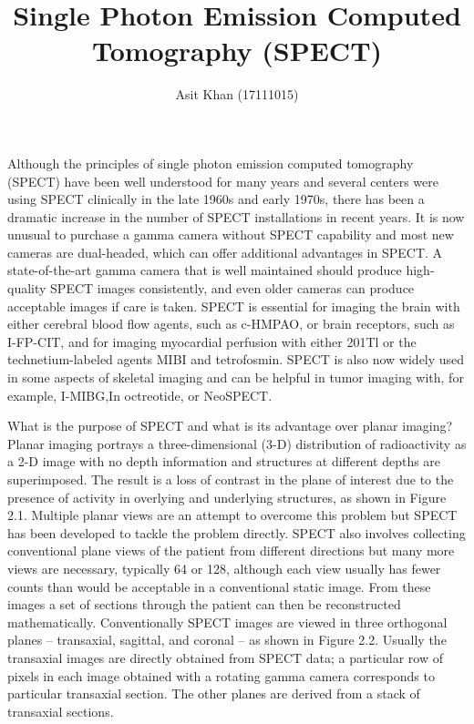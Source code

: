 \documentclass[12pt]{article}
\begin{document}
\title{Single Photon Emission Computed Tomography (SPECT)}
\author{Asit Khan (17111015)}
\maketitle




Although the principles of single photon emission computed tomography (SPECT) have been well understood for many years and several centers were using SPECT clinically in the late 1960s and early 1970s, there has been a dramatic increase in the number of SPECT installations in recent years. It is now unusual to purchase a gamma camera without SPECT capability and most new cameras are dual-headed, which can offer additional advantages in SPECT. A state-of-the-art gamma camera that is well maintained should produce high-quality SPECT images consistently, and even older cameras can produce acceptable images if care is taken. SPECT is essential for imaging the brain with either cerebral blood flow agents, such as c-HMPAO, or brain receptors, such as I-FP-CIT, and for imaging myocardial perfusion with either 201Tl or the technetium-labeled agents MIBI and tetrofosmin. SPECT is also now widely used in some aspects of skeletal imaging and can be helpful in tumor imaging with, for example, I-MIBG,In octreotide, or NeoSPECT.
\par
What is the purpose of SPECT and what is its advantage over planar imaging? Planar imaging portrays a three-dimensional (3-D) distribution of radioactivity as a 2-D image with no depth information and structures at different depths are superimposed. The result is a loss of contrast in the plane of interest due to the presence of activity in overlying and underlying structures, as shown in Figure 2.1. Multiple planar views are an attempt to overcome this problem but SPECT has been developed to tackle the problem directly. SPECT also involves collecting conventional plane views of the patient from different directions but many more views are necessary, typically 64 or 128, although each view usually has fewer counts than would be acceptable in a conventional static image. From these images a set of sections through the patient can then be reconstructed mathematically. Conventionally SPECT images are viewed in three orthogonal planes – transaxial, sagittal, and coronal – as shown in Figure 2.2. Usually the transaxial images are directly obtained from SPECT data; a particular row of pixels in each image obtained with a rotating gamma camera corresponds to particular transaxial section. The other planes are derived from a stack of transaxial sections.
\end{document}
